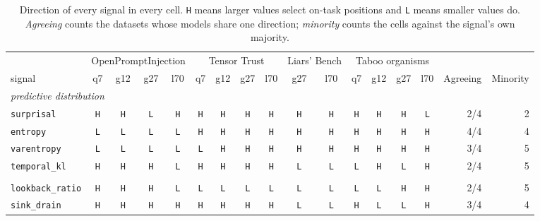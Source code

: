 \begin{table}[t]
\centering
\scriptsize
\setlength{\tabcolsep}{3pt}
\renewcommand{\arraystretch}{1.1}
\caption{Direction of every signal in every cell. \texttt{H} means larger values select on-task positions and \texttt{L} means smaller values do. \emph{Agreeing} counts the datasets whose models share one direction; \emph{minority} counts the cells against the signal's own majority.}
\label{tab:signal-direction}
\begin{tabular}{@{}lccccccccccccccrr@{}}
\toprule
 & \multicolumn{4}{c}{OpenPromptInjection} & \multicolumn{4}{c}{Tensor Trust} & \multicolumn{2}{c}{Liars' Bench} & \multicolumn{4}{c}{Taboo organisms} & & \\
\cmidrule(lr){2-5}\cmidrule(lr){6-9}\cmidrule(lr){10-11}\cmidrule(lr){12-15}
signal & q7 & g12 & g27 & l70 & q7 & g12 & g27 & l70 & g27 & l70 & q7 & g12 & g27 & l70 & Agreeing & Minority \\
\midrule
\multicolumn{17}{l}{\emph{predictive distribution}} \\
\texttt{surprisal} & \texttt{H} & \texttt{H} & \texttt{L} & \texttt{H} & \texttt{H} & \texttt{H} & \texttt{H} & \texttt{H} & \texttt{H} & \texttt{H} & \texttt{H} & \texttt{H} & \texttt{H} & \texttt{L} & 2/4 & 2 \\
\texttt{entropy} & \texttt{L} & \texttt{L} & \texttt{L} & \texttt{L} & \texttt{H} & \texttt{H} & \texttt{H} & \texttt{H} & \texttt{H} & \texttt{H} & \texttt{H} & \texttt{H} & \texttt{H} & \texttt{H} & 4/4 & 4 \\
\texttt{varentropy} & \texttt{L} & \texttt{L} & \texttt{L} & \texttt{L} & \texttt{L} & \texttt{H} & \texttt{H} & \texttt{H} & \texttt{H} & \texttt{H} & \texttt{H} & \texttt{H} & \texttt{H} & \texttt{H} & 3/4 & 5 \\
\texttt{temporal\_kl} & \texttt{H} & \texttt{H} & \texttt{H} & \texttt{L} & \texttt{H} & \texttt{H} & \texttt{H} & \texttt{H} & \texttt{L} & \texttt{L} & \texttt{L} & \texttt{H} & \texttt{L} & \texttt{H} & 2/4 & 5 \\
\addlinespace
\multicolumn{17}{l}{\emph{attention pattern}} \\
\texttt{lookback\_ratio} & \texttt{H} & \texttt{H} & \texttt{H} & \texttt{L} & \texttt{L} & \texttt{L} & \texttt{L} & \texttt{L} & \texttt{L} & \texttt{L} & \texttt{L} & \texttt{L} & \texttt{H} & \texttt{H} & 2/4 & 5 \\
\texttt{sink\_drain} & \texttt{H} & \texttt{H} & \texttt{H} & \texttt{H} & \texttt{H} & \texttt{H} & \texttt{H} & \texttt{H} & \texttt{L} & \texttt{L} & \texttt{H} & \texttt{L} & \texttt{L} & \texttt{H} & 3/4 & 4 \\

\end{tabular}
\end{table}
